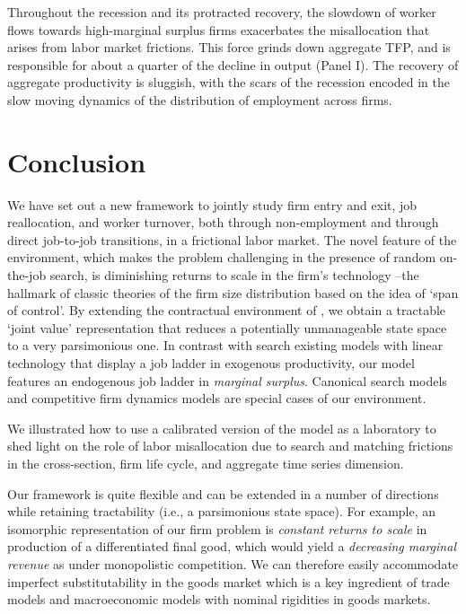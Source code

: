 Throughout the recession and its protracted recovery, the slowdown of worker flows towards high-marginal surplus firms exacerbates the misallocation that arises from labor market frictions.
This force grinds down aggregate TFP, and is responsible for about a quarter of the decline in output (Panel I).
The recovery of aggregate productivity is sluggish, with the scars of the recession encoded in the slow moving dynamics of the distribution of employment across firms.

\section{Conclusion}\label{sec:conclusion}
We have set out a new framework to jointly study firm entry and exit, job reallocation, and worker turnover, both through non-employment and through direct job-to-job transitions, in a frictional labor market. The novel feature of the environment, which makes the problem challenging in the presence of random on-the-job search, is diminishing returns to scale in the firm's technology --the hallmark of classic theories of the firm size distribution based on the idea of `span of control'. By extending the contractual environment of \citet{postelvinayrobin2002}, we obtain a tractable `joint value' representation that reduces a potentially unmanageable state space to a very parsimonious one. In contrast with search existing models with linear technology that display a job ladder in exogenous productivity, our model features an endogenous job ladder in \emph{marginal surplus}. Canonical search models and competitive firm dynamics models are special cases of our environment.

We illustrated how to use a calibrated version of the model as a laboratory to shed light on the role of labor misallocation due to search and matching frictions in the cross-section, firm life cycle, and aggregate time series dimension.

Our framework is quite flexible and can be extended in a number of directions while retaining tractability (i.e., a parsimonious state space).
For example, an isomorphic representation of our firm problem is \emph{constant returns to scale} in production of a differentiated final good, which would yield a \emph{decreasing marginal revenue} as under monopolistic competition.
We can therefore easily accommodate imperfect substitutability in the goods market which is a key ingredient of trade models and macroeconomic models with nominal rigidities in goods markets.

